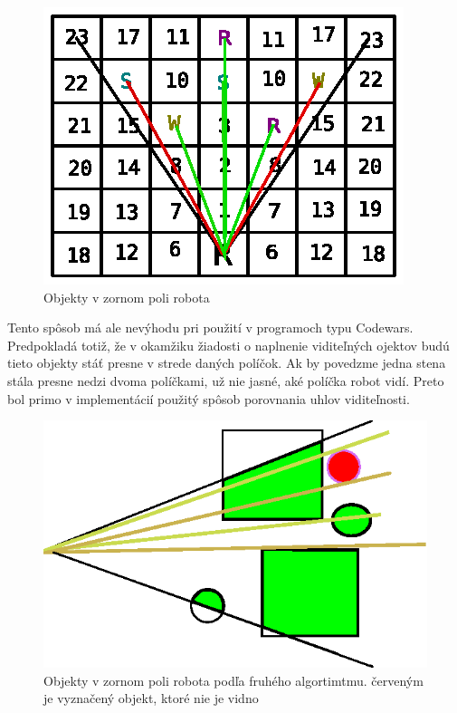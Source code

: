 \begin{figure}
\centering
\includegraphics[totalheight=0.4\textheight,width=.8\textwidth]{VisibleObjects}
\caption { Objekty v zornom poli robota}
\label{fig:visibleo}
\end{figure}
\indent
\newline
\indent Tento spôsob má ale nevýhodu pri použití v programoch typu Codewars. Predpokladá totiž, že v okamžiku žiadosti o naplnenie viditeľných ojektov budú tieto objekty stáť presne v strede daných políčok. Ak by povedzme jedna stena stála presne nedzi dvoma políčkami, už nie jasné, aké políčka robot vidí. Preto bol primo v implementácií použitý spôsob porovnania uhlov viditeľnosti.
\\
\begin{figure}
\centering
\includegraphics{visibility2}
\caption { Objekty v zornom poli robota podľa fruhého algortimtmu. červeným je vyznačený objekt, ktoré nie je vidno}
\label{fig:visibleo}
\end{figure}
\indent
